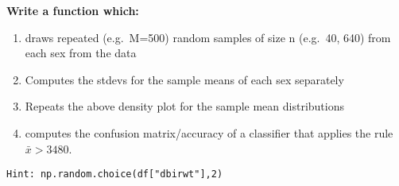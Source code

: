 \documentclass[
  letterpaper,
  DIV=11,
  numbers=noendperiod]{scrreprt}
\providecommand{\tightlist}{%
  \setlength{\itemsep}{0pt}\setlength{\parskip}{0pt}}\usepackage{longtable,booktabs,array}
\begin{document}
\textbf{Write a function which:}

\begin{enumerate}
\def\labelenumi{\arabic{enumi}.}
\tightlist
\item
  draws repeated (e.g.~M=500) random samples of size n (e.g.~40, 640)
  from each sex from the data
\item
  Computes the stdevs for the sample means of each sex separately
\item
  Repeats the above density plot for the sample mean distributions
\item
  computes the confusion matrix/accuracy of a classifier that applies
  the rule \(\bar{x} > 3480\).
\end{enumerate}

\texttt{Hint:\ np.random.choice(df{[}"dbirwt"{]},2)}
\end{document}
